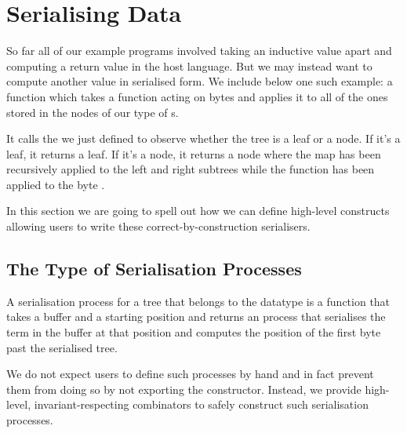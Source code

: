 \section{Serialising Data}\label{sec:serialising}

So far all of our example programs involved taking an inductive value
apart and computing a return value in the host language.
%
But we may instead want to compute another value in serialised form.
%
We include below one such example: a  function which
takes a function  acting on bytes
and applies it to all of the ones stored
in the nodes of our type of s.

\label{fig:serialised-map}

It calls the  we just defined to observe whether
the tree is a leaf or a node.
If it's a leaf, it returns a leaf.
If it's a node, it returns a node where the map has been recursively applied
to the left and right subtrees while the function  has been applied
to the byte .


In this section we are going to spell out how we can define high-level
constructs allowing users to write these correct-by-construction
serialisers.

\subsection{The Type of Serialisation Processes}

A serialisation process for a tree  that belongs to the
datatype  is a function that takes a buffer
and a starting position and returns an  process that
serialises the term in the buffer at that position and computes the
position of the first byte past the serialised tree.


We do not expect users to define such processes by hand and in fact
prevent them from doing so by not exporting the 
constructor.
%
Instead, we provide high-level, invariant-respecting combinators to safely
construct such serialisation processes.

